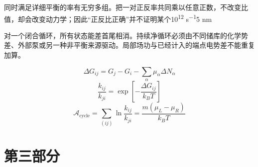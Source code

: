 {\cjkfont 同时满足详细平衡的率有无穷多组。把一对正反率共同乘以任意正数，不改变比值，却会改变动力学；因此“正反比正确”并不证明某个}\allowbreak{}10\textsuperscript{12} s\textsuperscript{−1}\allowbreak{}5 nm\allowbreak{}
\par
{\cjkfont 对一个闭合循环，所有状态能差首尾相消。持续净循环必须由不同储库的化学势差、外部泵或另一种非平衡来源驱动。局部场功与已经计入的端点电势差不能重复加算。}\allowbreak{}
\par
\begin{equation}
\Delta G_{ij}=G_j-G_i-\sum_\alpha\mu_\alpha\Delta N_\alpha
\label{eq:21}\end{equation}
\begin{equation}
\frac{k_{ij}}{k_{ji}}=\exp\!\left[-\frac{\Delta G_{ij}}{k_BT}\right]
\label{eq:22}\end{equation}
\begin{equation}
\mathcal{A}_{\mathrm{cycle}}=\sum_{(ij)}\ln\frac{k_{ij}}{k_{ji}}=\frac{m(\mu_L-\mu_R)}{k_BT}
\label{eq:23}\end{equation}
\medskip
\clearpage
\part*{{\cjkfont 第三部分}\allowbreak{} \allowbreak{}}
\FloatBarrier
\Needspace{110pt}
